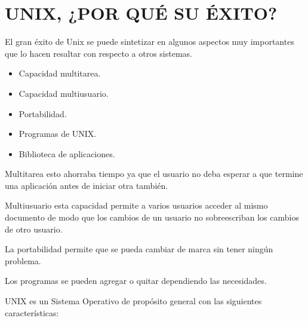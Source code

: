 \section*{UNIX, ¿POR QUÉ SU ÉXITO?}
El gran éxito de Unix se puede sintetizar en algunos aspectos muy importantes que lo hacen resaltar con respecto a otros sistemas.

\begin{itemize}
	\item Capacidad multitarea.
	\item Capacidad multiusuario.
	\item Portabilidad.
	\item Programas de UNIX.
	\item Biblioteca de aplicaciones.
\end{itemize} 

Multitarea esto ahorraba tiempo ya que el usuario no deba esperar a que termine una aplicación antes de iniciar otra también.
 
Multiusuario esta capacidad permite a varios usuarios acceder al mismo documento de modo que los cambios de un usuario no sobreescriban los cambios de otro usuario.                                                                  

La portabilidad permite que se pueda cambiar de marca sin tener ningún problema.

Los programas se pueden agregar o quitar dependiendo las necesidades.

UNIX es un Sistema Operativo de propósito general con las siguientes características:

